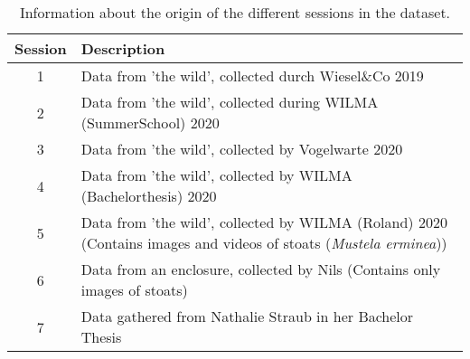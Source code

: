 \begin{table}[H]
\centering
\caption{Information about the origin of the different sessions in the dataset.}
\label{tab:session_info}
\begin{tabular}{c p{12cm}}
\toprule
Session & Description \\
\midrule
1 & Data from 'the wild', collected durch Wiesel\&Co 2019 \\
2 & Data from 'the wild', collected during WILMA (SummerSchool) 2020 \\
3 & Data from 'the wild', collected by Vogelwarte 2020 \\
4 & Data from 'the wild', collected by WILMA (Bachelorthesis) 2020 \\
5 & Data from 'the wild', collected by WILMA (Roland) 2020 (Contains images and videos of stoats (\textit{Mustela erminea})) \\
6 & Data from an enclosure, collected by Nils (Contains only images of stoats) \\
7 & Data gathered from Nathalie Straub in her Bachelor Thesis \\
\bottomrule
\end{tabular}
\end{table}